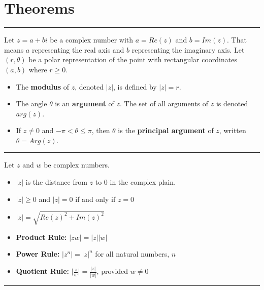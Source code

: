\section{Theorems}
\hrule \medskip

\begin{theorem}
    Let $z = a + bi$ be a complex number with $a = Re(z)$ and $b = Im(z)$. That means $a$ representing the real axis and $b$ representing the imaginary axis. Let $(r, \theta)$ be a polar representation of the point with rectangular coordinates $(a, b)$ where $r \geq 0$.
    
    \begin{itemize}
        \item The \textbf{modulus} of $z$, denoted $|z|$, is defined by $|z| = r$.
        \item The angle $\theta$ is an \textbf{argument} of $z$. The set of all arguments of $z$ is denoted $arg(z)$.
        \item If $z \neq 0$ and $-\pi < \theta \leq \pi$, then $\theta$ is the \textbf{principal argument} of $z$, written $\theta = Arg(z)$.
    \end{itemize}
\end{theorem}

\medskip \hrule \medskip 

\begin{theorem}
    Let $z$ and $w$ be complex numbers.
    
    \begin{itemize}
        \item $|z|$ is the distance from $z$ to $0$ in the complex plain. 
        \item $|z| \geq 0$ and $|z| = 0$ if and only if $z = 0$
        \item $|z| = \sqrt{Re(z)^2 + Im(z)^2}$
        \item \textbf{Product Rule:} $|zw| = |z||w|$
        \item \textbf{Power Rule:} $|z^n| = |z|^n$ for all natural numbers, $n$
        \item \textbf{Quotient Rule:} $\lvert \frac{z}{w} \rvert = \frac{|z|}{|w|}$, provided $w \neq 0$
    \end{itemize}
\end{theorem}

\medskip \hrule \medskip

